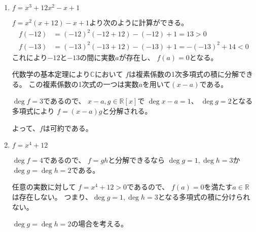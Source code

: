 \documentclass[12pt,b5paper]{ltjsarticle}
\begin{document}
\begin{enumerate}
       \hrulefill

 \item $f=x^3+12x^2-x+1$

       \dotfill


       $f=x^2(x+12)-x+1$より次のように計算ができる。
       \begin{align}
       f(-12)&=(-12)^2(-12+12)-(-12)+1=13>0\\
       f(-13)&=(-13)^2(-13+12)-(-13)+1=-(-13)^2+14<0
       \end{align}
       これにより$-12$と$-13$の間に実数$a$が存在し、
       $f(a)=0$となる。

       代数学の基本定理により$\mathbb{C}$において
       $f$は複素係数の1次多項式の積に分解できる。
       この複素係数の1次式の一つは実数$a$を用いて$(x-a)$である。


       $\deg{f}=3$であるので、
       $x-a,g\in\mathbb{R}[x]$で
       $\deg{x-a}=1$、
       $\deg{g}=2$となる多項式により
       $f=(x-a)g$と分解される。

       よって、$f$は可約である。

       \hrulefill

 \item $f=x^4+12$

       \dotfill

       $\deg{f}=4$であるので、
       $f=gh$と分解できるなら
       $\deg{g}=1,\deg{h}=3$か
       $\deg{g}=\deg{h}=2$である。

       任意の実数に対して
       $f=x^4+12>0$であるので、
       $f(a)=0$を満たす$a\in\mathbb{R}$は存在しない。
       つまり、$\deg{g}=1,\deg{h}=3$となる多項式の積に分けられない。

       $\deg{g}=\deg{h}=2$の場合を考える。
       

       \hrulefill

\end{enumerate}

\hrulefill
\end{document}
